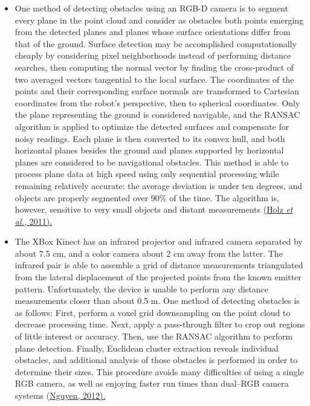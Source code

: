 \documentclass[12pt]{report}
\begin{document}
\begin{itemize}
\item{One method of detecting obstacles using an RGB-D camera is to segment every plane in the point cloud and consider as obstacles both points emerging from the detected planes and planes whose surface orientations differ from that of the ground.  Surface detection may be accomplished computationally cheaply by considering pixel neighborhoods instead of performing distance searches, then computing the normal vector by finding the cross-product of two averaged vectors tangential to the local surface.  The coordinates of the points and their corresponding surface normals are transformed to Cartesian coordinates from the robot's perspective, then to spherical coordinates.  Only the plane representing the ground is considered navigable, and the RANSAC algorithm is applied to optimize the detected surfaces and compensate for noisy readings.  Each plane is then converted to its convex hull, and both horizontal planes besides the ground and planes supported by horizontal planes are considered to be navigational obstacles.  This method is able to process plane data at high speed using only sequential processing while remaining relatively accurate: the average deviation is under ten degrees, and objects are properly segmented over 90\% of the time.  The algorithm is, however, sensitive to very small objects and distant measurements (\hyperref[bib:holz]{Holz \textit{et al.,} 2011).}}
\item{The XBox Kinect has an infrared projector and infrared camera separated by about 7.5 cm, and a color camera about 2 cm away from the latter.  The infrared pair is able to assemble a grid of distance measurements triangulated from the lateral displacement of the projected points from the known emitter pattern.  Unfortunately, the device is unable to perform any distance measurements closer than about 0.5 m.  One method of detecting obstacles is as follows:  First, perform a voxel grid downsampling on the point cloud to decrease processing time.  Next, apply a pass-through filter to crop out regions of little interest or accuracy.  Then, use the RANSAC algorithm to perform plane detection.  Finally, Euclidean cluster extraction reveals individual obstacles, and additional analysis of those obstacles is performed in order to determine their sizes.  This procedure avoids many difficulties of using a single RGB camera, as well as enjoying faster run times than dual--RGB camera systems (\hyperref[bib:nguyen]{Nguyen, 2012).}}

\end{itemize}
\end{document}
